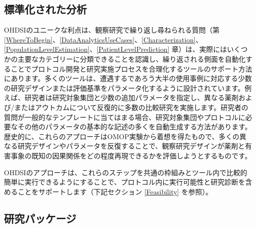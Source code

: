 \documentclass[
  11pt]{book}
\theoremstyle{definition}
\theoremstyle{definition}
\theoremstyle{definition}
\theoremstyle{definition}
\theoremstyle{remark}
\begin{document}
\subsection{標準化された分析}\label{ux6a19ux6e96ux5316ux3055ux308cux305fux5206ux6790}

OHDSIのユニークな利点は、観察研究で繰り返し尋ねられる質問（第 \ref{WhereToBegin}、\ref{DataAnalyticsUseCases}、\ref{Characterization}、\ref{PopulationLevelEstimation}、\ref{PatientLevelPrediction} 章）は、実際にはいくつかの主要なカテゴリーに分類できることを認識し、繰り返される側面を自動化することでプロトコル開発と研究実施プロセスを合理化するツールのサポート方法にあります。多くのツールは、遭遇するであろう大半の使用事例に対応する少数の研究デザインまたは評価基準をパラメータ化するように設計されています。例えば、研究者は研究対象集団と少数の追加パラメータを指定し、異なる薬剤および/またはアウトカムについて反復的に多数の比較研究を実施します。研究者の質問が一般的なテンプレートに当てはまる場合、研究対象集団やプロトコルに必要なその他のパラメータの基本的な記述の多くを自動生成する方法があります。歴史的に、これらのアプローチはOMOP実験から着想を得たもので、多くの異なる研究デザインやパラメータを反復することで、観察研究デザインが薬剤と有害事象の既知の因果関係をどの程度再現できるかを評価しようとするものです。

OHDSIのアプローチは、これらのステップを共通の枠組みとツール内で比較的簡単に実行できるようにすることで、プロトコル内に実行可能性と研究診断を含めることをサポートします（下記セクション \ref{Feasibility} を参照）。

\subsection{研究パッケージ}\label{ux7814ux7a76ux30d1ux30c3ux30b1ux30fcux30b8}

\end{document}
